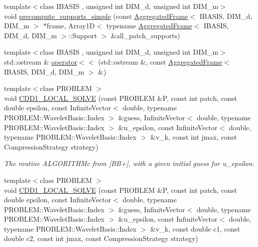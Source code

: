 \begin{CompactItemize}
\item 
{\footnotesize template$<$class IBASIS , unsigned int DIM\_\-d, unsigned int DIM\_\-m$>$ }\\void \hyperlink{namespaceFrameTL_d92777b6b7c3d1dc873761d9280ec994}{precompute\_\-supports\_\-simple} (const \hyperlink{classFrameTL_1_1AggregatedFrame}{AggregatedFrame}$<$ IBASIS, DIM\_\-d, DIM\_\-m $>$ $\ast$frame, Array1D$<$ typename \hyperlink{classFrameTL_1_1AggregatedFrame}{AggregatedFrame}$<$ IBASIS, DIM\_\-d, DIM\_\-m $>$::Support $>$ \&all\_\-patch\_\-supports)
\item 
{\footnotesize template$<$class IBASIS , unsigned int DIM\_\-d, unsigned int DIM\_\-m$>$ }\\std::ostream \& \hyperlink{namespaceFrameTL_218a9a8d5b69562375139a49043fce0b}{operator$<$$<$} (std::ostream \&, const \hyperlink{classFrameTL_1_1AggregatedFrame}{AggregatedFrame}$<$ IBASIS, DIM\_\-d, DIM\_\-m $>$ \&)
\item 
{\footnotesize template$<$class PROBLEM $>$ }\\void \hyperlink{namespaceFrameTL_8a92efb82d1634c8cf05737d5164b731}{CDD1\_\-LOCAL\_\-SOLVE} (const PROBLEM \&P, const int patch, const double epsilon, const InfiniteVector$<$ double, typename PROBLEM::WaveletBasis::Index $>$ \&guess, InfiniteVector$<$ double, typename PROBLEM::WaveletBasis::Index $>$ \&u\_\-epsilon, const InfiniteVector$<$ double, typename PROBLEM::WaveletBasis::Index $>$ \&v\_\-k, const int jmax, const CompressionStrategy strategy)
\begin{CompactList}\small\item\em The routine ALGORITHMc from \mbox{[}BB+\mbox{]}, with a given initial guess for u\_\-epsilon. \item\end{CompactList}\item 
\hypertarget{namespaceFrameTL_f1d8dd5608d705fbf2563b8a266d14a9}{
{\footnotesize template$<$class PROBLEM $>$ }\\void \hyperlink{namespaceFrameTL_f1d8dd5608d705fbf2563b8a266d14a9}{CDD1\_\-LOCAL\_\-SOLVE} (const PROBLEM \&P, const int patch, const double epsilon, const InfiniteVector$<$ double, typename PROBLEM::WaveletBasis::Index $>$ \&guess, InfiniteVector$<$ double, typename PROBLEM::WaveletBasis::Index $>$ \&u\_\-epsilon, const InfiniteVector$<$ double, typename PROBLEM::WaveletBasis::Index $>$ \&v\_\-k, const double c1, const double c2, const int jmax, const CompressionStrategy strategy)}
\label{namespaceFrameTL_f1d8dd5608d705fbf2563b8a266d14a9}


\end{CompactItemize}
